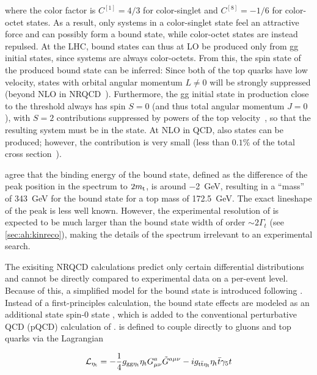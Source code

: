 \noindent where the color factor is $C^{[1]} = 4/3$ for color-singlet and $C^{[8]} = -1/6$ for color-octet states. As a result, only \ttbar systems in a color-singlet state feel an attractive force and can possibly form a bound state, while color-octet states are instead repulsed. At the LHC, \ttbar bound states can thus at LO be produced only from gg initial states, since \qqbar systems are always color-octets. From this, the spin state of the produced bound state can be inferred: Since both of the top quarks have low velocity, states with orbital angular momentum $L \neq 0$ will be strongly suppressed (beyond NLO in NRQCD~\cite{Kiyo:2008bv}). Furthermore, the gg initial state in \ttbar production close to the \ttbar threshold always has spin $S = 0$ (and thus total angular momentum $J = 0$), with $S = 2$ contributions suppressed by powers of the top velocity~\cite{Cheng:2024btk}, so that the resulting \ttbar system must be in the  state. At NLO in QCD, also  states can be produced; however, the contribution is very small (less than $0.1\%$ of the total cross section~\cite{Kiyo:2008bv}).

 agree that the binding energy of the \ttbar bound state, defined as the difference of the peak position in the \mWWbb spectrum to $2 m_{\mathrm{t}}$, is around \SI{-2}{\GeV}, resulting in a ``mass'' of \SI{343}{\GeV} for the \ttbar bound state for a top mass of \SI{172.5}{\GeV}. The exact lineshape of the peak is less well known. However, the experimental resolution of \mWWbb is expected to be much larger than the bound state width of order $\sim 2 \Gamma_t$ (see \cref{sec:ah:kinreco}), making the details of the spectrum irrelevant to an experimental search.

The exisiting NRQCD calculations predict only certain differential distributions and cannot be directly compared to experimental data on a per-event level. Because of this, a simplified model for the \ttbar bound state is introduced following . Instead of a first-principles calculation, the bound state effects are modeled as an additional state spin-0 state \etat, which is added to the conventional perturbative QCD (pQCD) calculation of \ttbar. \etat is defined to couple directly to gluons and top quarks via the Lagrangian

\begin{equation}
\label{eq:theory:etatlagrangian}
  \mathcal{L}_{\mathrm{\eta_t}} = - \frac{1}{4} g_{\mathrm{gg} \mathrm{\eta_t}} \mathrm{\eta_t} G^{a}_{\mu \nu} \tilde{G}^{a \mu \nu} - i g_{\mathrm{t \bar{t}} \mathrm{\eta_t}} \mathrm{\eta_t} \bar{t} \gamma_5 t
\end{equation}

